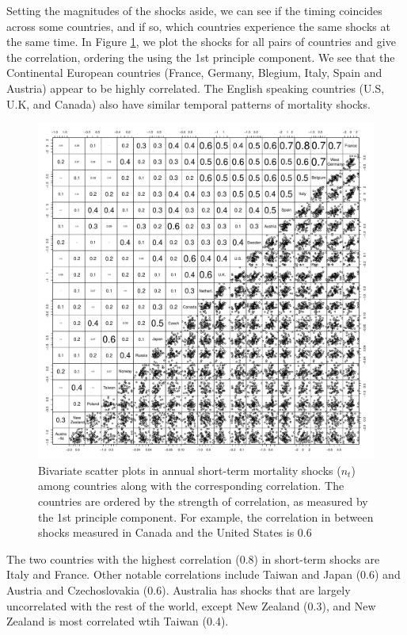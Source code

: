 \documentclass[12pt]{article}
\begin{document}
Setting the magnitudes of the shocks aside, we can see if the timing
coincides across some countries, and if so, which countries experience
the same shocks at the same time.  In Figure \ref{nt_corr_fig}, we plot the shocks for
all pairs of countries and give the correlation, ordering the using
the 1st principle component. We see that the Continental European
countries (France, Germany, Blegium, Italy, Spain and Austria) appear
to be highly correlated. The English speaking countries (U.S, U.K, and
Canada) also have similar temporal patterns of mortality shocks. 

\begin{figure}
  \includegraphics[width=1.05\textwidth]{./../code/nt_corr_plot.pdf}
  \caption{Bivariate scatter plots in annual short-term mortality
    shocks ($n_t$) among countries along with the corresponding
    correlation. The countries are ordered by the strength of
    correlation, as measured by the 1st principle component.  For
    example, the correlation in between shocks measured in Canada and
    the United States is 0.6}
    \label{nt_corr_fig}
\end{figure}

The two countries with the highest correlation (0.8) in short-term
shocks are Italy and France. Other notable correlations include Taiwan
and Japan (0.6) and Austria and Czechoslovakia (0.6). Australia has
shocks that are largely uncorrelated with the rest of the world,
except New Zealand (0.3), and New Zealand is most correlated wtih
Taiwan (0.4).
\end{document}
